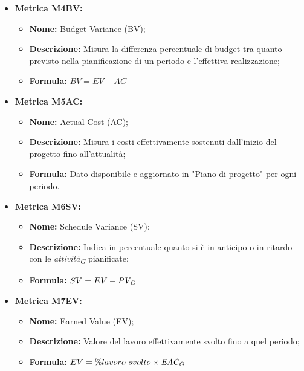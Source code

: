 \begin{itemize}
    \item \hypertarget{item:M4BV}{\textbf{Metrica M4BV:}}
     \begin{minipage}[t]{0.9\textwidth}
          \begin{itemize}
              \item \textbf{Nome:} Budget Variance (BV);
              \item \textbf{Descrizione:} Misura la differenza percentuale di budget tra quanto previsto nella pianificazione di un periodo e l’effettiva realizzazione;
              \item \textbf{Formula:} $BV = EV - AC $
          \end{itemize}
        \end{minipage}

    \item \hypertarget{item:M5AC}{\textbf{Metrica M5AC:}}
    \begin{minipage}[t]{0.9\textwidth}
          \begin{itemize}
              \item \textbf{Nome:} Actual Cost (AC);
              \item \textbf{Descrizione:} Misura i costi effettivamente sostenuti dall’inizio del progetto fino all’attualità; 
              \item \textbf{Formula:} Dato disponibile e aggiornato in "Piano di progetto" per ogni periodo.
          \end{itemize}
        \end{minipage}

    \item \hypertarget{item:M6SV}{\textbf{Metrica M6SV:}}
    \begin{minipage}[t]{0.9\textwidth}
          \begin{itemize}
              \item \textbf{Nome:} Schedule Variance (SV);
              \item \textbf{Descrizione:} Indica in percentuale quanto si è in anticipo o in ritardo con le \textit{attività}\textsubscript{\textit{G}} pianificate;
              \item \textbf{Formula:} $SV = EV - \textit{PV}\textsubscript{\textit{G}}$
          \end{itemize}
        \end{minipage}

    \item \hypertarget{item:M7EV}{\textbf{Metrica M7EV:}}
    \begin{minipage}[t]{0.9\textwidth}
          \begin{itemize}
              \item \textbf{Nome:} Earned Value (EV);
              \item \textbf{Descrizione:} Valore del lavoro effettivamente svolto fino a quel periodo;
              \item \textbf{Formula:} $EV = \% lavoro \ svolto \times \textit{EAC}\textsubscript{\textit{G}}$
          \end{itemize}
        \end{minipage}


\end{itemize}
